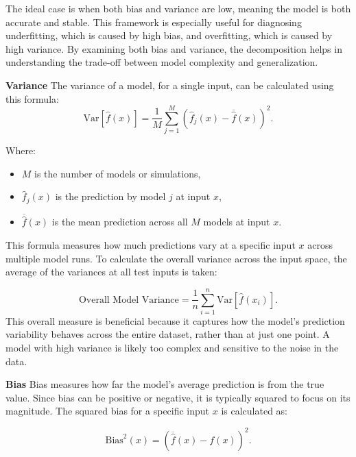\noindent The ideal case is when both bias and variance are low, meaning the model is both accurate and stable. This framework is especially useful for diagnosing underfitting, which is caused by high bias, and overfitting, which is caused by high variance. By examining both bias and variance, the decomposition helps in understanding the trade-off between model complexity and generalization.\newline

\noindent \textbf{Variance} \newline
\noindent The variance of a model, for a single input, can be calculated using this formula:
\begin{equation}
\text{Var}[\hat{f}(x)] = \frac{1}{M} \sum_{j=1}^{M} (\hat{f}_j(x) - \overline{\hat{f}}(x))^{2}.
\end{equation}

Where:
\begin{itemize}
	\item $M$ is the number of models or simulations,
	\item $\hat{f}_j(x)$ is the prediction by model $j$ at input $x$,
	\item $\overline{\hat{f}}(x)$ is the mean prediction across all $M$ models at input $x$.
\end{itemize}

\noindent This formula measures how much predictions vary at a specific input $x$ across multiple model runs. To calculate the overall variance across the input space, the average of the variances at all test inputs is taken:

\begin{equation}
\text{Overall Model Variance} = \frac{1}{n} \sum_{i=1}^{n} \text{Var}[\hat{f}(x_i)].
\end{equation}
This overall measure is beneficial because it captures how the model’s prediction variability behaves across the entire dataset, rather than at just one point. A model with high variance is likely too complex and sensitive to the noise in the data.\newline

\noindent \textbf{Bias}\newline
\noindent Bias measures how far the model’s average prediction is from the true value. Since bias can be positive or negative, it is typically squared to focus on its magnitude. The squared bias for a specific input $x$ is calculated as:

\begin{equation}
\text{Bias}^2(x) = (\overline{\hat{f}}(x) - f(x))^{2}.
\end{equation}

